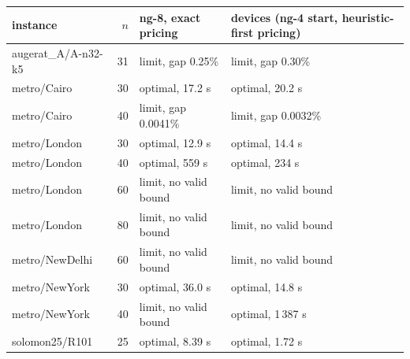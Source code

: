 \begin{tabular}{lrll}
\toprule
instance & $n$ & ng-8, exact pricing & devices (ng-4 start, heuristic-first pricing) \\
\midrule
augerat\_A/A-n32-k5 & 31 & limit, gap 0.25\% & limit, gap 0.30\% \\
metro/Cairo & 30 & optimal, 17.2 s & optimal, 20.2 s \\
metro/Cairo & 40 & limit, gap 0.0041\% & limit, gap 0.0032\% \\
metro/London & 30 & optimal, 12.9 s & optimal, 14.4 s \\
metro/London & 40 & optimal, 559 s & optimal, 234 s \\
metro/London & 60 & limit, no valid bound & limit, no valid bound \\
metro/London & 80 & limit, no valid bound & limit, no valid bound \\
metro/NewDelhi & 60 & limit, no valid bound & limit, no valid bound \\
metro/NewYork & 30 & optimal, 36.0 s & optimal, 14.8 s \\
metro/NewYork & 40 & limit, no valid bound & optimal, 1\,387 s \\
solomon25/R101 & 25 & optimal, 8.39 s & optimal, 1.72 s \\
\bottomrule
\end{tabular}
